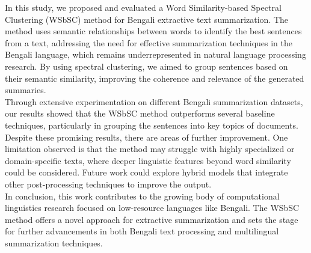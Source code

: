 
In this study, we proposed and evaluated a Word Similarity-based Spectral Clustering (WSbSC)
method for Bengali extractive text summarization.
The method uses semantic relationships between words to
identify the best sentences from a text, addressing the need for
effective summarization techniques in the Bengali language,
which remains underrepresented in natural language processing research.
By using spectral clustering,
we aimed to group sentences based on their semantic similarity,
improving the coherence and relevance of the generated summaries.\\

Through extensive experimentation on different Bengali summarization datasets,
our results showed that the WSbSC method outperforms several baseline techniques,
particularly in grouping the sentences into key topics of documents.
Despite these promising results,
there are areas of further improvement.
One limitation observed is that the method may struggle with highly
specialized or domain-specific texts,
where deeper linguistic features beyond word similarity could be considered.
Future work could explore hybrid models that integrate other
post-processing techniques to improve the output.\\

In conclusion, this work contributes to the growing body of computational
linguistics research focused on low-resource languages like Bengali.
The WSbSC method offers a novel approach for extractive summarization
and sets the stage for further advancements in both Bengali text processing
and multilingual summarization techniques.


